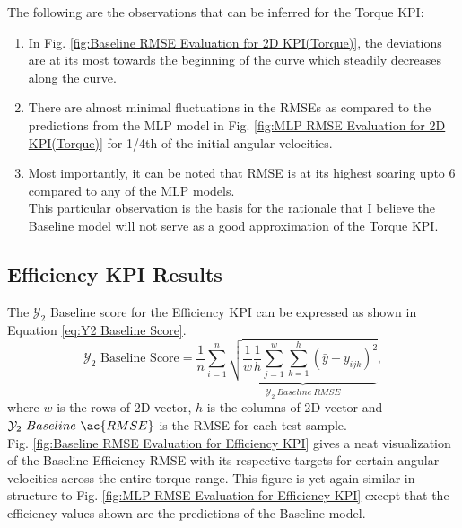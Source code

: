 \documentclass{report} %
\begin{document}
The following are the observations that can be inferred for the Torque \ac{KPI}:
\begin{enumerate}[nosep]
    
    \item In Fig. \ref{fig:Baseline RMSE Evaluation for 2D KPI(Torque)}, the deviations are at its most towards the beginning of the curve which steadily decreases along the curve.
    \item There are almost minimal fluctuations in the \ac{RMSE}s as compared to the predictions from the \ac{MLP} model in 
    Fig. \ref{fig:MLP RMSE Evaluation for 2D KPI(Torque)} for 1/4th of the initial angular velocities.
    \item Most importantly, it can be noted that \ac{RMSE} is at its highest soaring upto 6 compared to any of the \ac{MLP} models.\\
    This particular observation is the basis for the rationale that I believe the Baseline model will not serve as a good approximation of the Torque \ac{KPI}.\\
\end{enumerate}

\subsection{Efficiency KPI Results}\label{subsec:Efficiency KPI Results with Baseline}

The $\mathcal{Y}_2$ Baseline score for the Efficiency \ac{KPI} can be expressed as shown in Equation \ref{eq:Y2 Baseline Score}.
\begin{equation}
    \text{$\mathcal{Y}_2$ Baseline Score} = \frac{1}{n} \sum_{i=1}^{n} \underbrace{ \sqrt{\frac{1}{w} \frac{1}{h} \sum_{j=1}^{w} \sum_{k=1}^{h} (\bar{y} - y_{ijk})^2}}_{\mathcal{Y}_2\ Baseline\ RMSE},
    \label{eq:Y2 Baseline Score}
\end{equation}
where \(w\) is the rows of 2\ac{D} vector, \(h\) is the columns of 2\ac{D} vector and \(\mathcal{Y}_2\ Baseline\ \ac{RMSE}\) is the \ac{RMSE} for each test sample.\\

Fig. \ref{fig:Baseline RMSE Evaluation for Efficiency KPI} gives a neat visualization of the Baseline Efficiency \ac{RMSE} with its respective targets for certain angular velocities  
across the entire torque range. This figure is yet again similar in structure to Fig. \ref{fig:MLP RMSE Evaluation for Efficiency KPI} except that the efficiency values 
shown are the predictions of the Baseline model. \\
\end{document}
